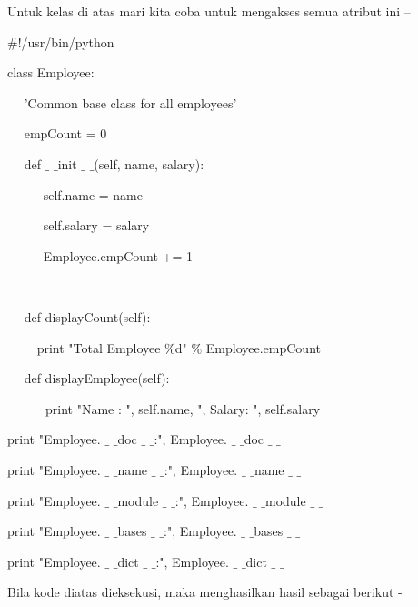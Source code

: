 \noindent 
Untuk kelas di atas mari kita coba untuk mengakses semua atribut ini – \par
\vspace{12pt}
\noindent 
 $  \#  $!/usr/bin/python \par
\vspace{12pt}
\noindent 
class Employee: \par
\noindent 
~~ 'Common base class for all employees' \par
\noindent 
~~ empCount = 0 \par
\vspace{12pt}
\noindent 
~~ def  $  \_  $ $  \_  $init $  \_  $ $  \_  $(self, name, salary): \par
\noindent 
~~~~~ self.name = name \par
\noindent 
~~~~~ self.salary = salary \par
\noindent 
~~~~~ Employee.empCount += 1 \par
\noindent 
~~  \par
\noindent 
~~ def displayCount(self): \par
\noindent 
~~~~ print "Total Employee  $  \%  $d"  $  \%  $ Employee.empCount \par
\vspace{12pt}
\noindent 
~~ def displayEmployee(self): \par
\noindent 
~~~~~~print "Name : ", self.name,  ", Salary: ", self.salary \par
\vspace{12pt}
\noindent 
print "Employee. $  \_  $ $  \_  $doc $  \_  $ $  \_  $:", Employee. $  \_  $ $  \_  $doc $  \_  $ $  \_  $ \par
\noindent 
print "Employee. $  \_  $ $  \_  $name $  \_  $ $  \_  $:", Employee. $  \_  $ $  \_  $name $  \_  $ $  \_  $ \par
\noindent 
print "Employee. $  \_  $ $  \_  $module $  \_  $ $  \_  $:", Employee. $  \_  $ $  \_  $module $  \_  $ $  \_  $ \par
\noindent 
print "Employee. $  \_  $ $  \_  $bases $  \_  $ $  \_  $:", Employee. $  \_  $ $  \_  $bases $  \_  $ $  \_  $ \par
\noindent 
print "Employee. $  \_  $ $  \_  $dict $  \_  $ $  \_  $:", Employee. $  \_  $ $  \_  $dict $  \_  $ $  \_  $ \par
\vspace{12pt}
\vspace{12pt}
\noindent 
Bila kode diatas dieksekusi, maka menghasilkan hasil sebagai berikut - \par
